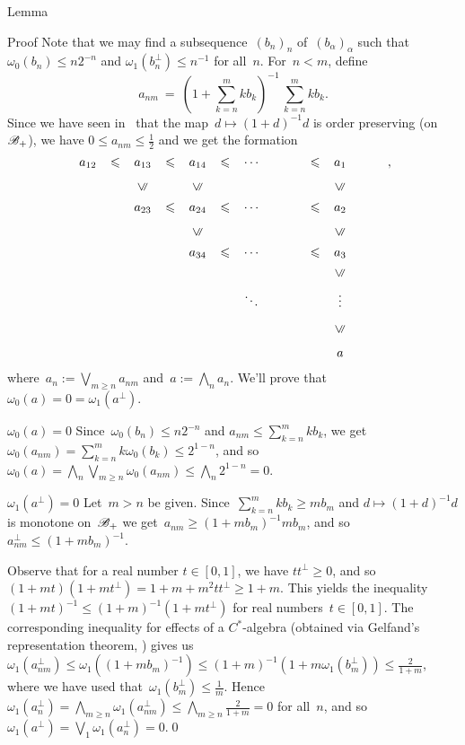 \documentclass[a]{subfiles}
\begin{document}
\begin{parsec}
\begin{point}{Lemma}
\begin{point}{Proof}
Note that we may find a subsequence~$(b_n)_n$ of~$(b_\alpha)_\alpha$
such that $\omega_0( b_n ) 
\leq n2^{-n}$
and $\omega_1(b_n^\perp)\leq n^{-1}$
for all~$n$.
For~$n < m$, define
\begin{equation*}
\textstyle
a_{nm}\ = \ (1+\sum_{k=n}^m kb_k)^{-1} \,\sum_{k=n}^m kb_k.
\end{equation*}
Since we have seen in~
that the map~$d\mapsto (1+d)^{-1}d$ is order preserving
(on~$\mathscr{B}_{+}$),
we have $0\leq a_{nm}\leq \frac{1}{2}$
and we get the formation
\begin{equation*}
\renewcommand{\labelstyle}{\textstyle}
\xymatrix{
a_{12}\ar@{}|-{\leq}[r] & 
a_{13}\ar@{}|-{\leq}[r] & 
a_{14}\ar@{}|-{\leq}[r]  & 
\dotsb & \ar@{}|-{\leq}[r]& a_1 \\
&
a_{23} \ar@{}|-{\leq}[r] \ar@{}[u]|-{\uleq} &
a_{24} \ar@{}|-{\leq}[r]  \ar@{}[u]|-{\uleq} &
\dotsb &\ar@{}|-{\leq}[r]& a_2  \ar@{}[u]|-{\uleq} \\
&
&
a_{34} \ar@{}|-{\leq}[r]  \ar@{}[u]|-{\uleq} & 
\dotsb & \ar@{}|-{\leq}[r] & a_3  \ar@{}[u]|-{\uleq} 
\\
&&&\ddots&&\vdots \ar@{}[u]|-{\uleq}& \\
&&&&&a\ar@{}[u]|-{\uleq}
},
\end{equation*}
where~$a_n:= \bigvee_{m\geq n} a_{nm}$
and~$a := \bigwedge_n a_n$.
We'll prove that~$\omega_0(a)=0=\omega_1(a^\perp)$.
\begin{point}{$\omega_0(a)=0$}%
	Since~$\omega_0(b_n)\leq n2^{-n}$ 
and $a_{nm}\leq \sum_{k=n}^m k b_k$,
we get~$\omega_0(a_{nm})=\sum_{k=n}^m k\omega_0(b_k) \leq 2^{1-n}$,
and so $\omega_0(a)=\bigwedge_n\bigvee_{m\geq n} \omega_0(a_{nm})
\leq \bigwedge_n 2^{1-n} = 0$.
\end{point}
\begin{point}{$\omega_1(a^\perp )=0$}%
Let~$m> n$ be given.
Since~$\sum_{k=n}^m kb_k \geq mb_m$
and $d\mapsto (1+d)^{-1}d$
is monotone on~$\mathscr{B}_{+}$
we get~$a_{nm} \geq (1+mb_m)^{-1} mb_m$,
and so~$a_{nm}^\perp \leq (1+mb_m)^{-1}$.

Observe that for a real number $t\in[0,1]$,
we have $tt^\perp \geq 0$,
and so $(1+mt)(1+mt^\perp) = 1+m+m^2tt^\perp \geq 1+m$.
This yields the inequality $(1+mt)^{-1}\leq (1+m)^{-1}(1+mt^\perp)$
for real numbers~$t\in[0,1]$.
The corresponding inequality for effects of a $C^*$-algebra
(obtained via Gelfand's representation theorem, )
gives us $\omega_1(a_{nm}^\perp)\leq \omega_1((1+mb_m)^{-1})
\leq (1+m)^{-1}(1+m\omega_1(b_m^\perp))\leq \frac{2}{1+m}$,
where we have used that~$\omega_1(b_m^\perp)\leq \frac{1}{m}$.
Hence~$\omega_1(a_n^\perp)=\bigwedge_{m\geq n} \omega_1(a_{nm}^\perp)
\leq \bigwedge_{m\geq n} \frac{2}{1+m}=0$ for all~$n$,
and so~$\omega_1(a^\perp)=\bigvee_1\omega_1(a_n^\perp)=0$.\qed
\end{point}
\end{point}



\end{point}
\end{parsec}
\end{document}
